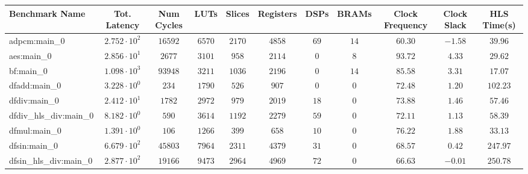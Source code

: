 \begin{tabular}{|l|c|c|c|c|c|c|c|c|c|c|}
\hline
Benchmark Name          & Tot. Latency           & Num Cycles & LUTs      & Slices    & Registers & DSPs    & BRAMs   & Clock Frequency & Clock Slack & HLS Time(s) \\
\hline
adpcm:main\_0           & $ 2.752 \cdot 10^{2} $ & $ 16592  $ & $ 6570  $ & $ 2170  $ & $ 4858  $ & $ 69  $ & $ 14  $ & $ 60.30       $ & $ -1.58   $ & $ 39.96   $ \\
aes:main\_0             & $ 2.856 \cdot 10^{1} $ & $ 2677   $ & $ 3101  $ & $ 958   $ & $ 2114  $ & $ 0   $ & $ 8   $ & $ 93.72       $ & $ 4.33    $ & $ 29.62   $ \\
bf:main\_0              & $ 1.098 \cdot 10^{3} $ & $ 93948  $ & $ 3211  $ & $ 1036  $ & $ 2196  $ & $ 0   $ & $ 14  $ & $ 85.58       $ & $ 3.31    $ & $ 17.07   $ \\
dfadd:main\_0           & $ 3.228 \cdot 10^{0} $ & $ 234    $ & $ 1790  $ & $ 526   $ & $ 907   $ & $ 0   $ & $ 0   $ & $ 72.48       $ & $ 1.20    $ & $ 102.23  $ \\
dfdiv:main\_0           & $ 2.412 \cdot 10^{1} $ & $ 1782   $ & $ 2972  $ & $ 979   $ & $ 2019  $ & $ 18  $ & $ 0   $ & $ 73.88       $ & $ 1.46    $ & $ 57.46   $ \\
dfdiv\_hls\_div:main\_0 & $ 8.182 \cdot 10^{0} $ & $ 590    $ & $ 3614  $ & $ 1192  $ & $ 2279  $ & $ 59  $ & $ 0   $ & $ 72.11       $ & $ 1.13    $ & $ 58.39   $ \\
dfmul:main\_0           & $ 1.391 \cdot 10^{0} $ & $ 106    $ & $ 1266  $ & $ 399   $ & $ 658   $ & $ 10  $ & $ 0   $ & $ 76.22       $ & $ 1.88    $ & $ 33.13   $ \\
dfsin:main\_0           & $ 6.679 \cdot 10^{2} $ & $ 45803  $ & $ 7964  $ & $ 2311  $ & $ 4379  $ & $ 31  $ & $ 0   $ & $ 68.57       $ & $ 0.42    $ & $ 247.97  $ \\
dfsin\_hls\_div:main\_0 & $ 2.877 \cdot 10^{2} $ & $ 19166  $ & $ 9473  $ & $ 2964  $ & $ 4969  $ & $ 72  $ & $ 0   $ & $ 66.63       $ & $ -0.01   $ & $ 250.78  $ \\

\end{tabular}
